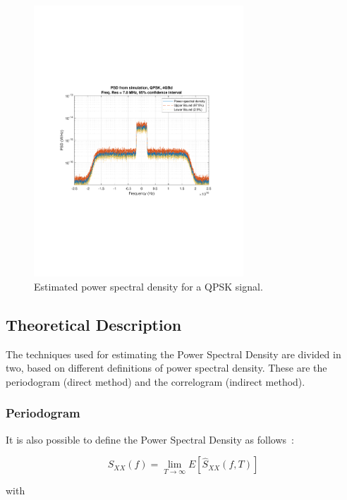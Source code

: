 \begin{refsection}
\begin{figure}[]
	\centering
	\includegraphics[clip, trim=2cm 8cm 2cm 8cm,width=0.7\textwidth]{./lib/power_spectral_density_estimator/figures/qpskExample.pdf}
	\caption{Estimated power spectral density for a QPSK
	signal.\label{fig:psdExample}}
	
\end{figure}

\subsection*{Theoretical Description}\label{sec:psdEstTeor}
The techniques used for estimating the Power Spectral Density are divided in two, based on different
definitions of power spectral density. These are the periodogram (direct method) and the
correlogram (indirect method).

\subsubsection*{Periodogram}

It is also possible to define the Power Spectral Density as follows~\cite{jeruchim06}:

\begin{equation}
	S_{XX}(f) = \lim_{T\to\infty} E \left[\hat{S}_{XX}\left(f, T\right)\right]
\end{equation}

\noindent with


\end{refsection}
